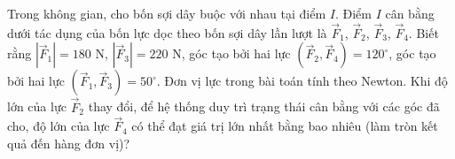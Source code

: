 \begin{ex}
Trong không gian, cho bốn sợi dây buộc với nhau tại điểm $I$. Điểm $I$ cân bằng dưới tác dụng của bốn lực dọc theo bốn sợi dây lần lượt là $\vec F_1$, $\vec F_2$, $\vec F_3$, $\vec F_4$. Biết rằng $|\vec F_1|=180$ N, $|\vec F_3|=220$ N, góc tạo bởi hai lực $\left(\vec F_2,\vec F_4\right)=120^\circ$, góc tạo bởi hai lực $\left(\vec F_1,\vec F_3\right)=50^\circ$. Đơn vị lực trong bài toán tính theo Newton. Khi độ lớn của lực $\vec F_2$ thay đổi, để hệ thống duy trì trạng thái cân bằng với các góc đã cho, độ lớn của lực $\vec F_4$ có thể đạt giá trị lớn nhất bằng bao nhiêu (làm tròn kết quả đến hàng đơn vị)?
\end{ex}
